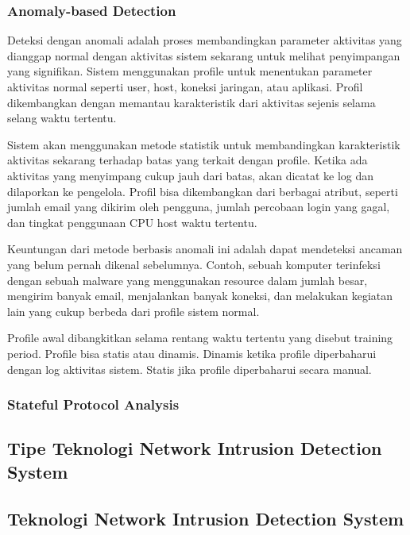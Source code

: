     \subsubsection{Anomaly-based Detection}

    Deteksi dengan anomali adalah proses membandingkan parameter aktivitas yang dianggap normal dengan aktivitas sistem sekarang untuk melihat penyimpangan yang signifikan. Sistem menggunakan profile untuk menentukan parameter aktivitas normal seperti user, host, koneksi jaringan, atau aplikasi. Profil dikembangkan dengan memantau karakteristik dari aktivitas sejenis selama selang waktu tertentu.

    Sistem akan menggunakan metode statistik untuk membandingkan karakteristik aktivitas sekarang terhadap batas yang terkait dengan profile. Ketika ada aktivitas yang menyimpang cukup jauh dari batas, akan dicatat ke log dan dilaporkan ke pengelola. Profil bisa dikembangkan dari berbagai atribut, seperti jumlah email yang dikirim oleh pengguna, jumlah percobaan login yang gagal, dan tingkat penggunaan CPU host waktu tertentu.

    Keuntungan dari metode berbasis anomali ini adalah dapat mendeteksi ancaman yang belum pernah dikenal sebelumnya. Contoh, sebuah komputer terinfeksi dengan sebuah malware yang menggunakan resource dalam jumlah besar, mengirim banyak email, menjalankan banyak koneksi, dan melakukan kegiatan lain yang cukup berbeda dari profile sistem normal.

    Profile awal dibangkitkan selama rentang waktu tertentu yang disebut training period. Profile bisa statis atau dinamis. Dinamis ketika profile diperbaharui dengan log aktivitas sistem. Statis jika profile diperbaharui secara manual.

    \subsubsection{Stateful Protocol Analysis}


  \subsection{Tipe Teknologi Network Intrusion Detection System}

  \subsection{Teknologi Network Intrusion Detection System}

